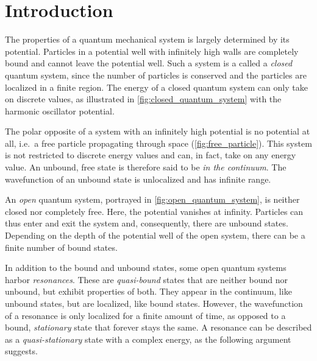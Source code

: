 \documentclass[../main/report.tex]{subfiles}
\begin{document}
\chapter{Introduction}

The properties of a quantum mechanical system is largely determined by its potential. 
Particles in a potential well with infinitely high walls are completely bound and cannot leave the potential well.
Such a system is a called a \emph{closed} quantum system, since the number of particles is conserved and the particles are localized in a finite region. 
The energy of a closed quantum system can only take on discrete values, as illustrated in \cref{fig:closed_quantum_system} with the harmonic oscillator potential.

The polar opposite of a system with an infinitely high potential is no potential at all, i.e.~a free particle propagating through space (\cref{fig:free_particle}).
This system is not restricted to discrete energy values and can, in fact, take on any energy value.
An unbound, free state is therefore said to be \emph{in the continuum}.
The wavefunction of an unbound state is unlocalized and has infinite range.

An \emph{open} quantum system, portrayed in \cref{fig:open_quantum_system}, is neither closed nor completely free.
Here, the potential vanishes at infinity.
Particles can thus enter and exit the system and, consequently, there are unbound states.
Depending on the depth of the potential well of the open system, there can be a finite number of bound states.

In addition to the bound and unbound states, some open quantum systems harbor \emph{resonances}. 
These are \emph{quasi-bound} states that are neither bound nor unbound, but exhibit properties of both. 
They appear in the continuum, like unbound states, but are localized, like bound states.
However, the wavefunction of a resonance is only localized for a finite amount of time, as opposed to a bound, \emph{stationary} state that forever stays the same.
A resonance can be described as a \emph{quasi-stationary} state with a complex energy, as the following argument suggests.

\end{document}
